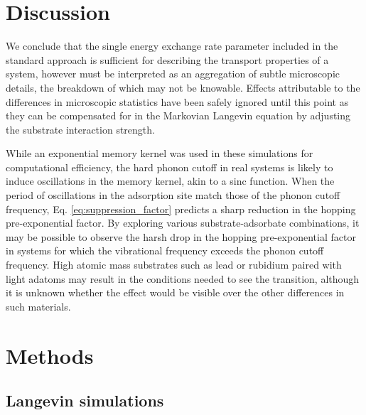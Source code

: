 \documentclass[7pt]{article}
\begin{document}
\section*{Discussion}

We conclude that the single energy exchange rate parameter included in the standard approach is sufficient for describing the transport properties of a system, however must be interpreted as an aggregation of subtle microscopic details, the breakdown of which may not be knowable. Effects attributable to the differences in microscopic statistics have been safely ignored until this point as they can be compensated for in the Markovian Langevin equation by adjusting the substrate interaction strength.

While an exponential memory kernel was used in these simulations for computational efficiency, the hard phonon cutoff in real systems is likely to induce oscillations in the memory kernel, akin to a sinc function. When the period of oscillations in the adsorption site match those of the phonon cutoff frequency, Eq. \ref{eq:suppression_factor} predicts a sharp reduction in the hopping pre-exponential factor. By exploring various substrate-adsorbate combinations, it may be possible to observe the harsh drop in the hopping pre-exponential factor in systems for which the vibrational frequency exceeds the phonon cutoff frequency. High atomic mass substrates such as lead or rubidium paired with light adatoms may result in the conditions needed to see the transition, although it is unknown whether the effect would be visible over the other differences in such materials.  



\section*{Methods}

\subsection*{Langevin simulations}
\end{document}
